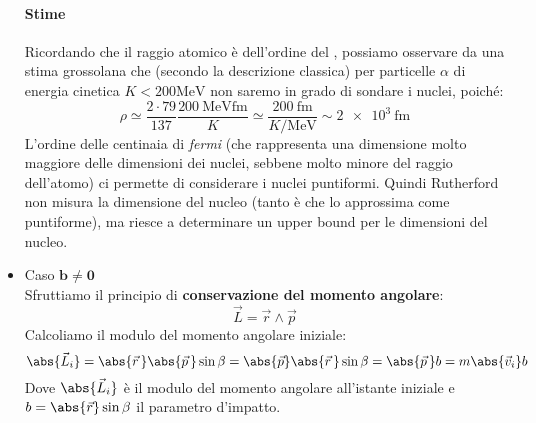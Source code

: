 \begin{itemize}
	      \paragraph{Stime} Ricordando che il raggio atomico è dell'ordine del
	      , possiamo osservare da una stima grossolana che (secondo la
	      descrizione classica) per particelle $\alpha$ di energia cinetica
	      $K<200\si{\MeV}$ non saremo in grado di sondare i nuclei, poiché:
	      \begin{equation}
		      \rho \simeq \frac{2\cdot 79}{137}\frac{\SI{200}{\MeV \femto\m}}{K}
		      \simeq
		      \frac{\SI{200}{\femto\m}}{K \si{\per \MeV}} \sim \SI{2e3}{\femto\m}
	      \end{equation}
	      L'ordine delle centinaia di \textit{fermi} (che rappresenta una dimensione
	      molto maggiore delle dimensioni dei nuclei, sebbene molto minore del raggio
	      dell'atomo) ci permette di considerare i nuclei puntiformi. Quindi
	      Rutherford non misura la dimensione del nucleo (tanto è che lo approssima
	      come puntiforme), ma riesce a determinare un upper bound per le dimensioni
	      del nucleo.

	\item Caso $\boxed{\boldsymbol{b \neq 0}}$\\
	      Sfruttiamo il principio di \textbf{conservazione del momento angolare}:
	      \begin{equation}
		      \vec{L} = \vec{r} \wedge \vec{p}
	      \end{equation}
	      Calcoliamo il modulo del momento angolare iniziale:
	      \begin{equation}
		      \abs{\vec{L}_i} = \abs{\vec{r}\,} \abs{\vec{p}\,} \sin{\beta} =
		      \abs{\vec{p}} \abs{\vec{r}\,} \sin{\beta} = \abs{\vec{p}\,} b =
		      m\abs{\vec{v}_i}b
		      \label{eq:mod_mom_ang_iniziale}
	      \end{equation}
	      Dove $\abs{\vec{L}_i}$ è il modulo del momento angolare all'istante
	      iniziale e $b = \abs{\vec{r}}\sin{\beta}$ il parametro d'impatto.


\end{itemize}
